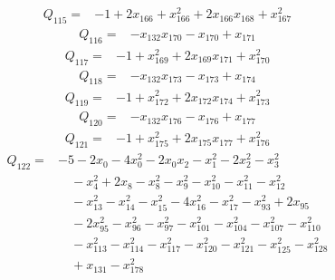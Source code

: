 \begin{equation*}\begin{split}
Q_{115}={}&-1 + 2x_{166} + x_{166}^{2} + 2x_{166} x_{168} + x_{167}^{2}
\end{split}\end{equation*}
\begin{equation*}\begin{split}
Q_{116}={}&-x_{132} x_{170} - x_{170} + x_{171}
\end{split}\end{equation*}
\begin{equation*}\begin{split}
Q_{117}={}&-1 + x_{169}^{2} + 2x_{169} x_{171} + x_{170}^{2}
\end{split}\end{equation*}
\begin{equation*}\begin{split}
Q_{118}={}&-x_{132} x_{173} - x_{173} + x_{174}
\end{split}\end{equation*}
\begin{equation*}\begin{split}
Q_{119}={}&-1 + x_{172}^{2} + 2x_{172} x_{174} + x_{173}^{2}
\end{split}\end{equation*}
\begin{equation*}\begin{split}
Q_{120}={}&-x_{132} x_{176} - x_{176} + x_{177}
\end{split}\end{equation*}
\begin{equation*}\begin{split}
Q_{121}={}&-1 + x_{175}^{2} + 2x_{175} x_{177} + x_{176}^{2}
\end{split}\end{equation*}
\begin{equation*}\begin{split}
Q_{122}={}&-5 - 2x_{0} - 4x_{0}^{2} - 2x_{0} x_{2} - x_{1}^{2} - 2x_{2}^{2} - x_{3}^{2}\\
&\quad -x_{4}^{2} + 2x_{8} - x_{8}^{2} - x_{9}^{2} - x_{10}^{2} - x_{11}^{2} - x_{12}^{2}\\
&\quad -x_{13}^{2} - x_{14}^{2} - x_{15}^{2} - 4x_{16}^{2} - x_{17}^{2} - x_{93}^{2} + 2x_{95}\\
&\quad -2x_{95}^{2} - x_{96}^{2} - x_{97}^{2} - x_{101}^{2} - x_{104}^{2} - x_{107}^{2} - x_{110}^{2}\\
&\quad -x_{113}^{2} - x_{114}^{2} - x_{117}^{2} - x_{120}^{2} - x_{121}^{2} - x_{125}^{2} - x_{128}^{2}\\
&\quad + x_{131} - x_{178}^{2}
\end{split}\end{equation*}
